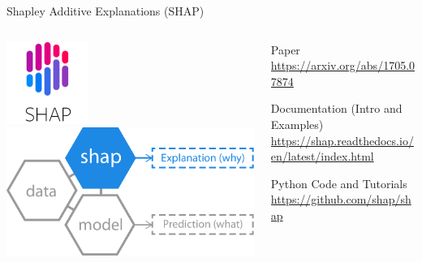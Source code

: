 \documentclass[ignorenonframetext,xcolor=x11names]{beamer}
\begin{document}
\begin{frame}{Shapley Additive Explanations (SHAP)}
\small
\begin{columns}
\begin{column}{0.25\textwidth}
\centering

\includegraphics[width=.5\textwidth]{shap_logo.png} \\

\vspace{\baselineskip}
\includegraphics[width=\textwidth]{shap_logo.pdf}
\end{column}
\begin{column}{0.75\textwidth}
\begin{block}{Paper}
\url{https://arxiv.org/abs/1705.07874}
\end{block}

\begin{block}{Documentation (Intro and Examples)}
\url{https://shap.readthedocs.io/en/latest/index.html}
\end{block}

\begin{block}{Python Code and Tutorials}
\url{https://github.com/shap/shap}
\end{block}
\end{column}
\end{columns}

\end{frame}
\end{document}
